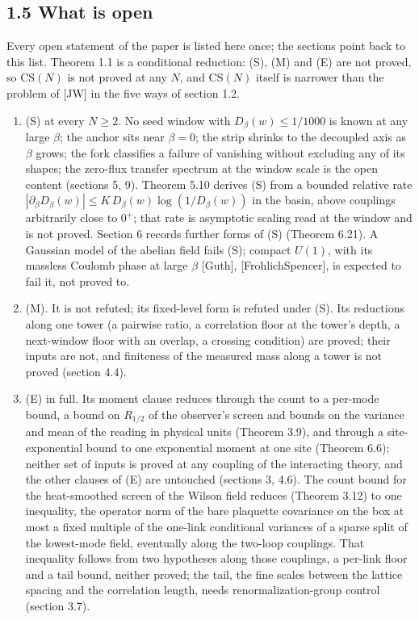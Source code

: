 \documentclass[10pt,letterpaper,twocolumn]{article}
\providecommand{\tightlist}{\setlength{\itemsep}{0pt}\setlength{\parskip}{0pt}}
\begin{document}
\subsection{1.5 What is open}\label{15-what-is-open}

Every open statement of the paper is listed here once; the sections point back to this list. Theorem 1.1 is a conditional reduction: (S), (M) and (E) are not proved, so \(\mathrm{CS}(N)\) is not proved at any \(N\), and \(\mathrm{CS}(N)\) itself is narrower than the problem of {[}JW{]} in the five ways of section 1.2.

\begin{enumerate}
\def\labelenumi{\arabic{enumi}.}
\tightlist
\item
  (S) at every \(N\ge2\). No seed window with \(D_\beta(w)\le1/1000\) is known at any large \(\beta\); the anchor sits near \(\beta=0\); the strip shrinks to the decoupled axis as \(\beta\) grows; the fork classifies a failure of vanishing without excluding any of its shapes; the zero-flux transfer spectrum at the window scale is the open content (sections 5, 9). Theorem 5.10 derives (S) from a bounded relative rate \(|\partial_\beta D_\beta(w)|\le K\,D_\beta(w)\log(1/D_\beta(w))\) in the basin, above couplings arbitrarily close to \(0^+\); that rate is asymptotic scaling read at the window and is not proved. Section 6 records further forms of (S) (Theorem 6.21). A Gaussian model of the abelian field fails (S); compact \(U(1)\), with its massless Coulomb phase at large \(\beta\) {[}Guth{]}, {[}FrohlichSpencer{]}, is expected to fail it, not proved to.
\item
  (M). It is not refuted; its fixed-level form is refuted under (S). Its reductions along one tower (a pairwise ratio, a correlation floor at the tower's depth, a next-window floor with an overlap, a crossing condition) are proved; their inputs are not, and finiteness of the measured mass along a tower is not proved (section 4.4).
\item
  (E) in full. Its moment clause reduces through the count to a per-mode bound, a bound on \(R_{1/2}\) of the observer's screen and bounds on the variance and mean of the reading in physical units (Theorem 3.9), and through a site-exponential bound to one exponential moment at one site (Theorem 6.6); neither set of inputs is proved at any coupling of the interacting theory, and the other clauses of (E) are untouched (sections 3, 4.6). The count bound for the heat-smoothed screen of the Wilson field reduces (Theorem 3.12) to one inequality, the operator norm of the bare plaquette covariance on the box at most a fixed multiple of the one-link conditional variances of a sparse split of the lowest-mode field, eventually along the two-loop couplings. That inequality follows from two hypotheses along those couplings, a per-link floor and a tail bound, neither proved; the tail, the fine scales between the lattice spacing and the correlation length, needs renormalization-group control (section 3.7).

\end{enumerate}
\end{document}
